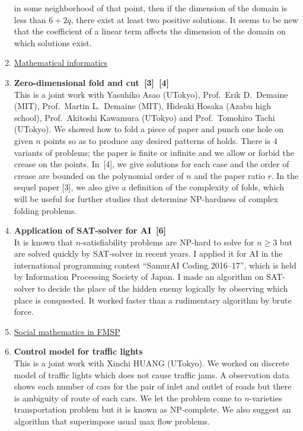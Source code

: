 \documentclass[a4j,twocolumn]{jarticle}
\begin{document}
\begin{enumerate}
       in some neighborhood of that point, then
       if the dimension of the domain is less than $6 + 2q$,
       there exist at least two positive solutions.
       It seems to be new that the coefficient of a linear term affects
       the dimension of the domain on which solutions exist.
 \item[] \underline{Mathematical informatics}
 \item {\bf Zero-dimensional fold and cut~[3]~[4]} \\
       This is a joint work with
       Yasuhiko Asao (UTokyo), Prof.~Erik D.~Demaine (MIT),
       Prof.~Martin L.~Demaine (MIT), Hideaki Hosaka (Azabu high school),
       Prof.~Akitoshi Kawamura (UTokyo)
       and Prof.~Tomohiro Tachi (UTokyo).
       We showed how to fold a piece of paper and punch one hole
       on given $n$ points
       so as to produce any desired patterns of holds.
       There is $4$ variants of problems;
       the paper is finite or infinite
       and we allow or forbid the crease on the points.
       In~[4], we give solutions for each case and the order of crease
       are bounded on the polynomial order of $n$ and the paper ratio
       $r$.
       In the sequel paper [3], we also give a definition of
       the complexity of folds, which
       will be useful for further studies that determine
       NP-hardness of complex folding problems.
 \item {\bf Application of SAT-solver for AI~[6]} \\
       It is known that $n$-satisfiability problems are NP-hard
       to solve for $n \geq 3$
       but are solved quickly by SAT-solver in recent years.
       I applied it for AI in the international
       programming contest ``SamurAI Coding
       2016--17'', which is held by Information
       Processing Society of Japan. I made an algorithm on SAT-solver
       to decide the place of the hidden enemy logically
       by observing which place is conquested.
       It worked faster than a rudimentary algorithm by brute force.
 \item[] \underline{Social mathematics in FMSP}
 \item {\bf Control model for traffic lights} \\
       This is a joint work with Xinchi HUANG (UTokyo).
       We worked on discrete model of traffic lights which does not
       cause traffic jams.
       A observation data shows each number of cars for the pair of
       inlet and outlet of roads but there is ambiguity of
       route of each cars.
       We let the problem come to
       $n$-varieties transportation problem but it is known as
       NP-complete. We also suggest an algorithm
       that superimpose usual max flow problems.
\end{enumerate}
\end{document}
